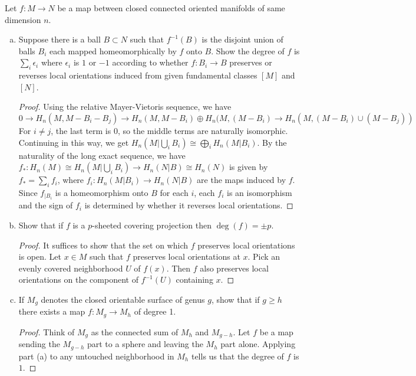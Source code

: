 \documentclass{article}
\begin{document}
 Let $f : M \to N$ be a map between closed connected oriented manifolds of same dimension $n$.
\begin{enumerate}[a.]
\item Suppose there is a ball $B \subset N$ such that $f^{-1}(B)$ is the disjoint union of balls $B_i$ each 
mapped homeomorphically by $f$ onto $B$. Show the degree of $f$ is $\sum_i \epsilon_i$ where $\epsilon_i$
is $1$ or $-1$ according to whether $f:B_i \to B$ preserves or reverses local orientations induced from
given fundamental classes $[M]$ and $[N]$.
\begin{proof} 
Using the relative Mayer-Vietoris sequence, we have 
$$0 \to H_n(M, M- B_i -B_j) \to H_n(M, M- B_i) \oplus H_n(M, (M- B_i) \to H_n(M, (M- B_i) \cup (M - B_j))$$
For $i \neq j$, the last term is $0$, so the middle terms are naturally isomorphic. Continuing in this way, we get
$H_n(M | \bigcup_i B_i) \cong \bigoplus_i H_n(M | B_i)$. By the naturality of the long exact sequence,
 we have $f_*:H_n(M) \cong H_n(M | \bigcup_i B_i) \to H_n( N | B) \cong H_n(N)$ is given by
$f_* = \sum_i f_i$, where $f_i: H_n(M|B_i) \to H_n(N|B)$ are the maps induced by $f$.  Since $f_{|B_i}$ is
a homeomorphism onto $B$ for each $i$, each $f_i$ is an isomorphism and the sign of $f_i$ is determined 
by whether it reverses local orientations.  
\end{proof}
\item Show that if $f$ is a $p$-sheeted covering projection then $\deg(f) = \pm p$.
\begin{proof}
It suffices to show that the set on which $f$ preserves local orientations is open. Let $x \in M$
such that $f$ preserves local orientations at $x$. Pick an evenly covered neighborhood $U$ of $f(x)$.  
Then $f$ also preserves local orientations on the component of $f^{-1}(U)$ containing $x$.
\end{proof}

\item If $M_g$ denotes the closed orientable surface of genus $g$, show that if $g \ge h$ there exists 
a map $f: M_g \to M_h$ of degree 1.
\begin{proof}
Think of $M_g$ as the connected sum of $M_h$ and $M_{g-h}$. 
Let $f$ be a map sending the $M_{g-h}$ part to a sphere and leaving the $M_h$ part alone.
 Applying part (a) to any untouched neighborhood in $M_h$ tells us that the degree of $f$ is $1$.
\end{proof}


\end{enumerate}
\end{document}
